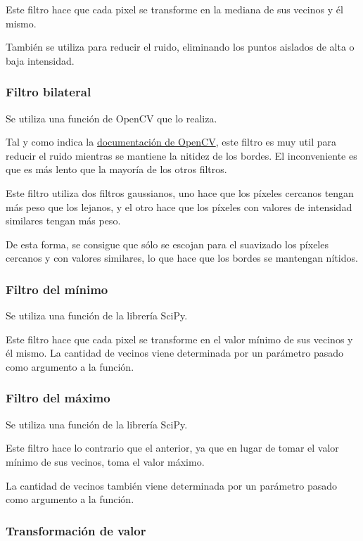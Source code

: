 \documentclass[12pt]{article}
\begin{document}
Este filtro hace que cada pixel se transforme en la mediana de sus vecinos y él mismo.

También se utiliza para reducir el ruido, eliminando los puntos aislados de alta o baja intensidad.

\subsubsection*{Filtro bilateral}

Se utiliza una función de OpenCV que lo realiza.

Tal y como indica la \href{https://docs.opencv.org/4.x/d4/d86/group__imgproc__filter.html#ga564869aa33e58769b4469101aac458f9}{documentación de OpenCV}, este filtro es muy util para reducir el ruido mientras se mantiene la nitidez de los bordes. El inconveniente es que es más lento que la mayoría de los otros filtros.

Este filtro utiliza dos filtros gaussianos, uno hace que los píxeles cercanos tengan más peso que los lejanos, y el otro hace que los píxeles con valores de intensidad similares tengan más peso. 

De esta forma, se consigue que sólo se escojan para el suavizado los píxeles cercanos y con valores similares, lo que hace que los bordes se mantengan nítidos.

\subsubsection*{Filtro del mínimo}

Se utiliza una función de la librería SciPy.

Este filtro hace que cada pixel se transforme en el valor mínimo de sus vecinos y él mismo. La cantidad de vecinos viene determinada por un parámetro pasado como argumento a la función.


\subsubsection*{Filtro del máximo}

Se utiliza una función de la librería SciPy.

Este filtro hace lo contrario que el anterior, ya que en lugar de tomar el valor mínimo de sus vecinos, toma el valor máximo.

La cantidad de vecinos también viene determinada por un parámetro pasado como argumento a la función.

\subsubsection*{Transformación de valor}
\end{document}
